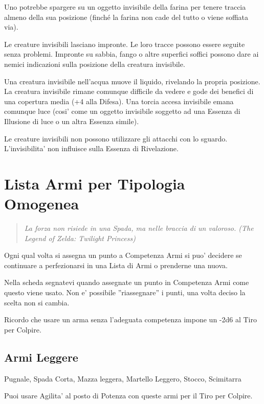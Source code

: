 \documentclass[a4paper,11pt,twoside,openany]{book}
\begin{document}
	Uno potrebbe spargere su un oggetto invisibile della farina per tenere traccia almeno della sua posizione (finché la farina non cade del tutto o viene soffiata via).
	
	Le creature invisibili lasciano impronte. Le loro tracce possono essere seguite senza problemi. Impronte su sabbia, fango o altre superfici soffici possono dare ai nemici indicazioni sulla posizione della creatura invisibile.
	
	Una creatura invisibile nell'acqua muove il liquido, rivelando la propria posizione. La creatura invisibile rimane comunque difficile da vedere e gode dei benefici di una copertura media (+4 alla Difesa). Una torcia accesa invisibile emana comunque luce (cosi' come un oggetto invisibile soggetto ad una Essenza di Illusione di luce o un altra Essenza simile).
	
	Le creature invisibili non possono utilizzare gli attacchi con lo sguardo. L'invisibilita' non influisce sulla Essenza di Rivelazione.
	
	\pagebreak
	
	\section{Lista Armi per Tipologia Omogenea}
	
	\label{lista-armi-per-tipologia-omogenea}
	\begin{quote}\textit{La forza non risiede in una Spada, ma nelle braccia di un valoroso. (The Legend of Zelda: Twilight Princess)
	}\end{quote}
	
	Ogni qual volta si assegna un punto a Competenza Armi si puo' decidere se continuare a perfezionarsi in una Lista di Armi o prenderne una nuova.
	
	Nella scheda segnatevi quando assegnate un punto in Competenza Armi come questo viene usato. Non e' possibile ''riassegnare'' i punti, una volta deciso la scelta non si cambia.
	
	Ricordo che usare un arma senza l'adeguata competenza impone un -2d6 al Tiro per Colpire.
	
	\subsection{Armi Leggere}Pugnale, Spada Corta, Mazza leggera, Martello Leggero, Stocco, Scimitarra
	
	Puoi usare Agilita' al posto di Potenza con queste armi per il Tiro
	per Colpire.
	
\end{document}
